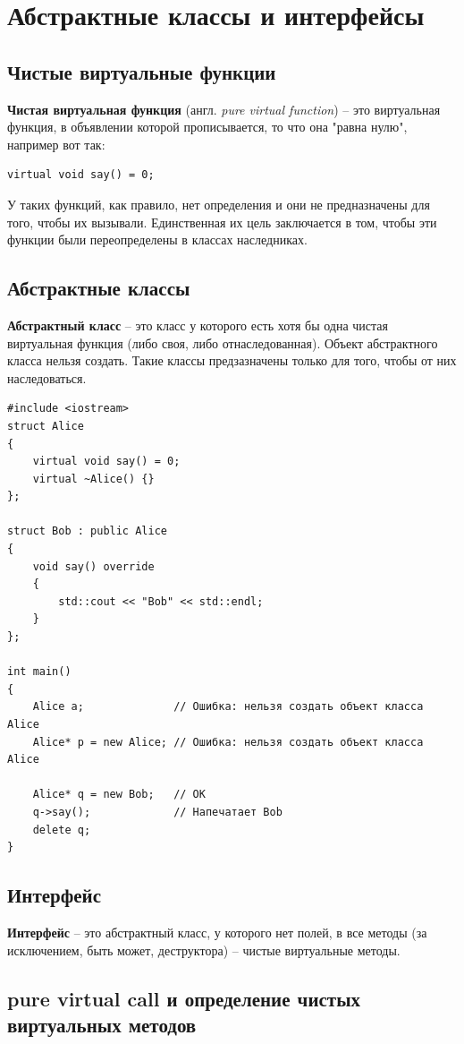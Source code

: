 \documentclass{article}
\begin{document}
\newpage
\section{Абстрактные классы и интерфейсы}
\subsection*{Чистые виртуальные функции}
\textbf{Чистая виртуальная функция} (англ. \textit{pure virtual function}) -- это виртуальная функция, в объявлении которой прописывается, то что она "равна нулю"{}, например вот так:
\begin{lstlisting}
virtual void say() = 0;
\end{lstlisting}
У таких функций, как правило, нет определения и они не предназначены для того, чтобы их вызывали. Единственная их цель заключается в том, чтобы эти функции были переопределены в классах наследниках.
\subsection*{Абстрактные классы}
\textbf{Абстрактный класс} -- это класс у которого есть хотя бы одна чистая виртуальная функция (либо своя, либо отнаследованная). Объект абстрактного класса нельзя создать. Такие классы предзазначены только для того, чтобы от них наследоваться.
\begin{lstlisting}
#include <iostream>
struct Alice 
{
    virtual void say() = 0;
    virtual ~Alice() {}
};

struct Bob : public Alice 
{
    void say() override
    {
    	std::cout << "Bob" << std::endl;
    }
};

int main()
{
	Alice a;              // Ошибка: нельзя создать объект класса Alice
	Alice* p = new Alice; // Ошибка: нельзя создать объект класса Alice
	
	Alice* q = new Bob;   // ОК
	q->say();             // Напечатает Bob
	delete q;
}
\end{lstlisting}

\subsection*{Интерфейс}
\textbf{Интерфейс} -- это абстрактный класс, у которого нет полей, в все методы (за исключением, быть может, деструктора) -- чистые виртуальные методы.

\subsection*{pure virtual call и определение чистых виртуальных методов}
\end{document}
